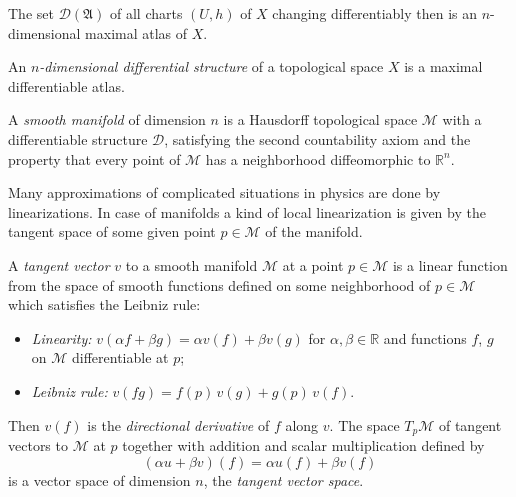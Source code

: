 The set $\mathscr{D}(\mathfrak{A})$ of all charts $(U, h)$ of $X$ changing differentiably then is an $n$-dimensional maximal atlas of $X$. \cite[2]{Jaenich-1992}

\begin{definition}
	An \emph{$n$-dimensional differential structure} of a topological space $X$ is a maximal differentiable atlas. 
\end{definition}

\begin{definition}
A \emph{smooth manifold} of dimension $n$ is 
a Hausdorff topological space $\mathscr{M}$ with a differentiable structure $\mathscr{D}$, satisfying the second countability axiom and the property that every point of $\mathscr{M}$ has a neighborhood diffeomorphic to $\mathbb{R}^n$.
\end{definition}

Many approximations of complicated situations in physics are done by linearizations. In case of manifolds a kind of local linearization is given by the tangent space of some given point $p \in \mathscr{M}$ of the manifold.

\begin{definition}
	A \emph{tangent vector} $v$ to a smooth manifold $\mathscr{M}$ at a point $p \in \mathscr{M}$ is a linear function from the space of smooth functions defined on some neighborhood of $p \in \mathscr{M}$ which satisfies the Leibniz rule:
	\begin{itemize}
	\item
	\emph{Linearity:} 
	$v(\alpha f + \beta g) = \alpha v(f) + \beta v(g)$
	for $\alpha, \beta \in \mathbb{R}$ and functions $f$, $g$ on $\mathscr{M}$ differentiable at $p$;
	
	\item
	\emph{Leibniz rule:}
	$v (fg) = f(p)\, v(g) + g(p) \, v(f).$
	\end{itemize}
	Then $v(f)$ is the \emph{directional derivative}
	of $f$ along $v$.
	The space $T_p \mathscr{M}$ of tangent vectors to $\mathscr{M}$ at $p$ together with addition and scalar multiplication defined by
	\begin{equation*}
		(\alpha u + \beta v) (f)
		= \alpha u (f) + \beta v (f)
	\end{equation*}
	is a vector space of dimension $n$, the \emph{tangent vector space}.
\end{definition}

